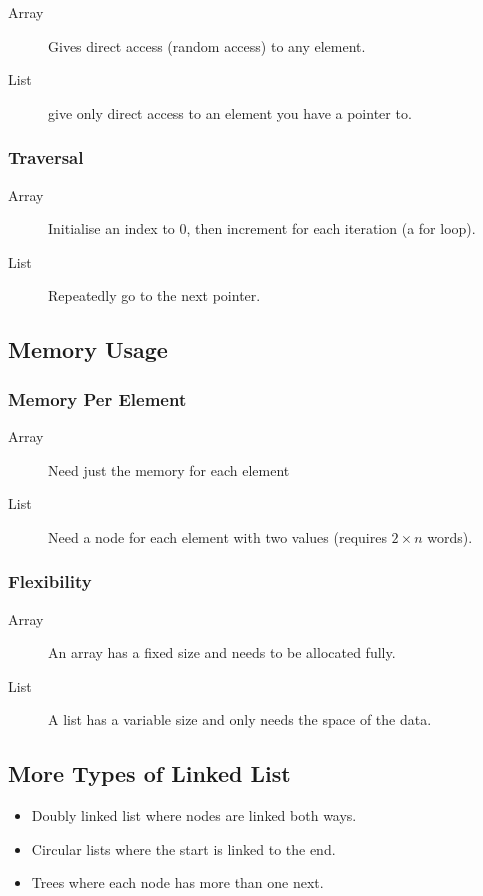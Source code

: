 \begin{description}
	\item[Array] Gives direct access (random access) to any element.
	\item[List] give only direct access to an element you have a pointer to.
\end{description}

\subsubsection{Traversal}\label{ssub:traversal}

\begin{description}
	\item[Array] Initialise an index to \(0\), then increment for each iteration (a for loop).
	\item[List] Repeatedly go to the next pointer.
\end{description}

\subsection{Memory Usage}\label{sub:memory_usage}

\subsubsection{Memory Per Element}\label{ssub:memory_per_element}

\begin{description}
	\item[Array] Need just the memory for each element
	\item[List] Need a node for each element with two values (requires \(2 \times n\) words).
\end{description}

\subsubsection{Flexibility}\label{ssub:flexibility}

\begin{description}
	\item[Array] An array has a fixed size and needs to be allocated fully.
	\item[List] A list has a variable size and only needs the space of the data.
\end{description}

\subsection{More Types of Linked List}\label{sub:more_types_of_linked_list}

\begin{itemize}
	\item Doubly linked list where nodes are linked both ways.
	\item Circular lists where the start is linked to the end.
	\item Trees where each node has more than one next.
\end{itemize}
